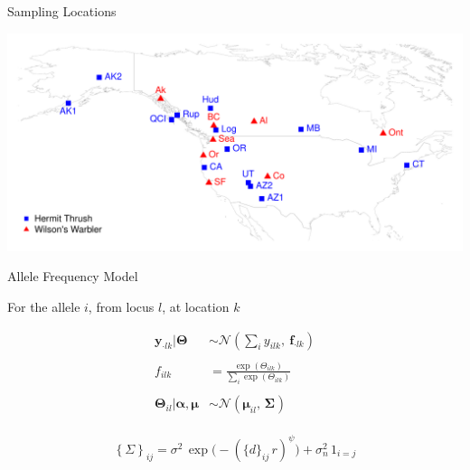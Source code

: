 \documentclass[11pt,ignorenonframetext,]{beamer}
\begin{document}
\begin{frame}{Sampling Locations}
\protect\hypertarget{sampling-locations}{}

\begin{center}
\includegraphics[width=\textwidth]{figs/sampling_locs.pdf}
\end{center}

\end{frame}

\begin{frame}{Allele Frequency Model}
\protect\hypertarget{allele-frequency-model}{}

For the allele \(i\), from locus \(l\), at location \(k\)

\[
\begin{aligned}
\symbf{y}_{\cdot l k}|\symbf{\Theta} &\sim \mathcal{N}\left(\textstyle\sum_i y_{ilk},\: \symbf{f}_{\cdot l k}\right) \\
\\
f_{ilk} &= \frac{\exp(\Theta_{ilk})}{\sum_i \exp(\Theta_{ilk})} \\
\\
\symbf{\Theta}_{il}|\symbf{\alpha},\symbf{\mu} &\sim \mathcal{N}( \symbf{\mu}_{il},\, \symbf{\Sigma_{}}) \\
\end{aligned}
\]

\[ \left\{\Sigma\right\}_{ij} = \sigma^2 \, \exp \Big(-(\{d\}_{ij}\, r)^{\psi} \Big) + \sigma^2_n \, {1}_{i=j} \]

\end{frame}
\end{document}
